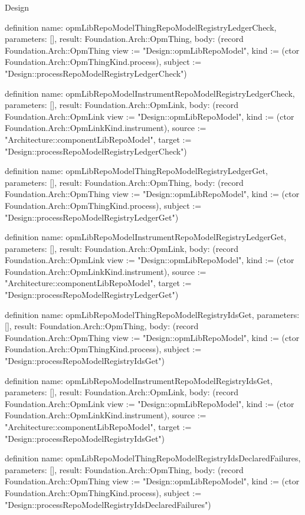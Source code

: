 \begin{lexlean}{Design}
\begin{semanticmodule}
definition{
  name: opmLibRepoModelThingRepoModelRegistryLedgerCheck,
  parameters: [],
  result: Foundation.Arch::OpmThing,
  body: (record Foundation.Arch::OpmThing {view := "Design::opmLibRepoModel", kind := (ctor Foundation.Arch::OpmThingKind.process), subject := "Design::processRepoModelRegistryLedgerCheck"})
}

definition{
  name: opmLibRepoModelInstrumentRepoModelRegistryLedgerCheck,
  parameters: [],
  result: Foundation.Arch::OpmLink,
  body: (record Foundation.Arch::OpmLink {view := "Design::opmLibRepoModel", kind := (ctor Foundation.Arch::OpmLinkKind.instrument), source := "Architecture::componentLibRepoModel", target := "Design::processRepoModelRegistryLedgerCheck"})
}

definition{
  name: opmLibRepoModelThingRepoModelRegistryLedgerGet,
  parameters: [],
  result: Foundation.Arch::OpmThing,
  body: (record Foundation.Arch::OpmThing {view := "Design::opmLibRepoModel", kind := (ctor Foundation.Arch::OpmThingKind.process), subject := "Design::processRepoModelRegistryLedgerGet"})
}

definition{
  name: opmLibRepoModelInstrumentRepoModelRegistryLedgerGet,
  parameters: [],
  result: Foundation.Arch::OpmLink,
  body: (record Foundation.Arch::OpmLink {view := "Design::opmLibRepoModel", kind := (ctor Foundation.Arch::OpmLinkKind.instrument), source := "Architecture::componentLibRepoModel", target := "Design::processRepoModelRegistryLedgerGet"})
}

definition{
  name: opmLibRepoModelThingRepoModelRegistryIdsGet,
  parameters: [],
  result: Foundation.Arch::OpmThing,
  body: (record Foundation.Arch::OpmThing {view := "Design::opmLibRepoModel", kind := (ctor Foundation.Arch::OpmThingKind.process), subject := "Design::processRepoModelRegistryIdsGet"})
}

definition{
  name: opmLibRepoModelInstrumentRepoModelRegistryIdsGet,
  parameters: [],
  result: Foundation.Arch::OpmLink,
  body: (record Foundation.Arch::OpmLink {view := "Design::opmLibRepoModel", kind := (ctor Foundation.Arch::OpmLinkKind.instrument), source := "Architecture::componentLibRepoModel", target := "Design::processRepoModelRegistryIdsGet"})
}

definition{
  name: opmLibRepoModelThingRepoModelRegistryIdsDeclaredFailures,
  parameters: [],
  result: Foundation.Arch::OpmThing,
  body: (record Foundation.Arch::OpmThing {view := "Design::opmLibRepoModel", kind := (ctor Foundation.Arch::OpmThingKind.process), subject := "Design::processRepoModelRegistryIdsDeclaredFailures"})
}


\end{semanticmodule}
\end{lexlean}
